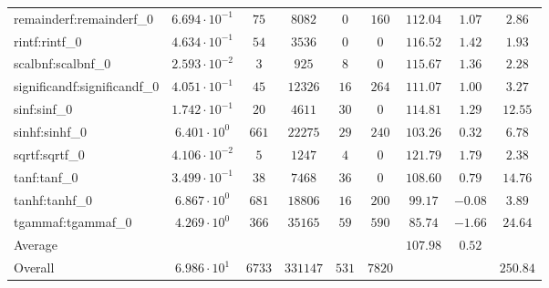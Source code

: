 \begin{tabular}{|l|c|c|c|c|c|c|c|c|}
remainderf:remainderf\_0     & $ 6.694 \cdot 10^{-1} $ & $ 75     $ & $ 8082   $ & $ 0   $ & $ 160  $ & $ 112.04      $ & $ 1.07    $ & $ 2.86    $ \\
rintf:rintf\_0               & $ 4.634 \cdot 10^{-1} $ & $ 54     $ & $ 3536   $ & $ 0   $ & $ 0    $ & $ 116.52      $ & $ 1.42    $ & $ 1.93    $ \\
scalbnf:scalbnf\_0           & $ 2.593 \cdot 10^{-2} $ & $ 3      $ & $ 925    $ & $ 8   $ & $ 0    $ & $ 115.67      $ & $ 1.36    $ & $ 2.28    $ \\
significandf:significandf\_0 & $ 4.051 \cdot 10^{-1} $ & $ 45     $ & $ 12326  $ & $ 16  $ & $ 264  $ & $ 111.07      $ & $ 1.00    $ & $ 3.27    $ \\
sinf:sinf\_0                 & $ 1.742 \cdot 10^{-1} $ & $ 20     $ & $ 4611   $ & $ 30  $ & $ 0    $ & $ 114.81      $ & $ 1.29    $ & $ 12.55   $ \\
sinhf:sinhf\_0               & $ 6.401 \cdot 10^{0}  $ & $ 661    $ & $ 22275  $ & $ 29  $ & $ 240  $ & $ 103.26      $ & $ 0.32    $ & $ 6.78    $ \\
sqrtf:sqrtf\_0               & $ 4.106 \cdot 10^{-2} $ & $ 5      $ & $ 1247   $ & $ 4   $ & $ 0    $ & $ 121.79      $ & $ 1.79    $ & $ 2.38    $ \\
tanf:tanf\_0                 & $ 3.499 \cdot 10^{-1} $ & $ 38     $ & $ 7468   $ & $ 36  $ & $ 0    $ & $ 108.60      $ & $ 0.79    $ & $ 14.76   $ \\
tanhf:tanhf\_0               & $ 6.867 \cdot 10^{0}  $ & $ 681    $ & $ 18806  $ & $ 16  $ & $ 200  $ & $ 99.17       $ & $ -0.08   $ & $ 3.89    $ \\
tgammaf:tgammaf\_0           & $ 4.269 \cdot 10^{0}  $ & $ 366    $ & $ 35165  $ & $ 59  $ & $ 590  $ & $ 85.74       $ & $ -1.66   $ & $ 24.64   $ \\
\hline
Average                      & $                     $ & $        $ & $        $ & $     $ & $      $ & $ 107.98      $ & $ 0.52    $ & $         $ \\
\hline
Overall                      & $ 6.986 \cdot 10^{1}  $ & $ 6733   $ & $ 331147 $ & $ 531 $ & $ 7820 $ & $             $ & $         $ & $ 250.84  $ \\
\hline
\end{tabular}
